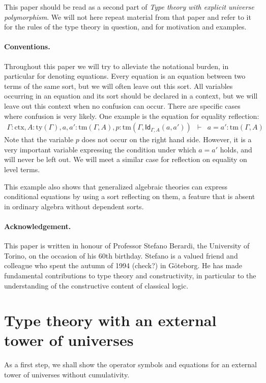 \documentclass[11pt,a4paper]{article}
\theoremstyle{definition}
\newcommand{\Id}{\mathsf{Id}}
\newcommand{\ctx}{\mathrm{ctx}}
\newcommand{\ty}{\mathrm{ty}}
\newcommand{\tm}{\mathrm{tm}}
\begin{document}
This paper should be read as a second part of {\em Type theory with explicit universe polymorphism}. We will not here repeat material from that paper and refer to it for the rules of the type theory in question, and for motivation and examples. 

\paragraph{Conventions.} Throughout this paper we will try to alleviate
the notational burden, in particular for denoting equations.
Every equation is an equation between two terms of the same sort, 
but we will often leave out this sort. 
All variables occurring in an equation and its sort should be declared 
in a context, but we will leave out this context when no confusion can occur.
There are specific cases where confusion is very likely. One example is
the equation for equality reflection:
\begin{eqnarray*}
\Gamma : \ctx, A : \ty(\Gamma), a, a' : \tm(\Gamma, A),p :  \tm(\Gamma,\Id_{\Gamma,A}(a,a'))&\vdash& a = a' : \tm(\Gamma,A)
\end{eqnarray*}
Note that the variable $p$ does not occur on the right hand side.
However, it is a very important variable expressing
the condition under which $a=a'$ holds, and will never be left out.
We will meet a similar case for reflection on equality on level terms.

This example also shows that generalized algebraic theories can express 
conditional equations by using a sort reflecting on them, 
a feature that is absent in ordinary algebra without dependent sorts.

\paragraph{Acknowledgement.} This paper is written in honour of Professor Stefano Berardi, the University of Torino, on the occasion of his 60th birthday. Stefano is a valued friend and colleague who spent the autumn of 1994 (check?) in Göteborg. He has made fundamental contributions to type theory and constructivity, in particular to the understanding of the constructive content of classical logic.

\section{Type theory with an external tower of universes}

As a first step, we shall show the operator symbols and equations for an external tower of universes without cumulativity. %
\end{document}

